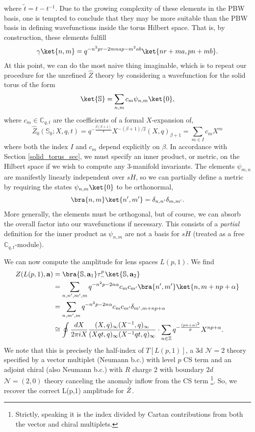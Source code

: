\documentclass{article}
\def\be{\begin{equation}}
\def\ee{\end{equation}}
\numberwithin{corollary}{theorem}
\numberwithin{corollary}{proposition}
\begin{document}
where $\tilde{t} = t-t^{-1}$. Due to the growing complexity of these elements in the PBW basis, one is tempted to conclude that they may be more suitable than the PBW basis in defining wavefunctions inside the torus Hilbert space. That is, by construction, these elements fulfill 
$$\gamma \ket{n,m} = q^{-n^2pr -2m n ap -m^2 ab}\ket{nr+ma,pn+mb}.$$
At this point, we can do the most naive thing imaginable, which is to repeat our procedure for the unrefined $\hat{Z}$ theory by considering a wavefunction for the solid torus of the form
\be \label{wrong_ref_torus_wavfn}\ket{\mathbb{S}} = \sum_{n,m} c_m \psi_{n,m}\ket{0},\ee 
where $c_m \in \mathbb{C}_{q,t}$ are the coefficients of a formal $X$-expansion of,
$$\hat{Z}_0 (\mathbb{S}_0;X,q,t) = q^{-\frac{\beta(\beta+1)}{4}}X^{-(\beta+1)/2} (X,q)_{\beta+1} = \sum_{m\in I} c_m X^m $$
where both the index $I$ and $c_m$ depend explicitly on $\beta$. In accordance with Section \ref{solid_torus_sec}, we must specify an inner product, or metric, on the Hilbert space if we wish to compute any 3-manifold invariants. The elements $\psi_{m,n}$ are manifestly linearly independent over $s\ddot{H}$, so we can partially define a metric by requiring the states $\psi_{n,m}\ket{0}$ to be orthonormal, 
$$\bra{n,m}\ket{n',m'} = \delta_{n,n'}\delta_{m,m'}.$$
More generally, the elements must be orthogonal, but of course, we can absorb the overall factor into our wavefunctions if necessary. This consists of a \textit{partial} definition for the inner product as $\psi_{n,m}$ are not a basis for $s\ddot{H}$ (treated as a free $\mathbb{C}_{q,t}$-module).

We can now compute the amplitude for lens spaces $L(p,1)$. We find 
\begin{align*}
Z(L(p,1),\mathbf{a})& =\bra{\mathbb{S},\mathbf{a}_1}\tau_-^p  \ket{\mathbb{S},\mathbf{a}_2}  \\
&= \sum_{n,n',m',m} q^{-n^2p -2n\alpha}  c_m c_{m'} \bra{n',m'}\ket{n,m+np+\alpha}\\
&= \sum_{n,m',m} q^{-n^2p -2n\alpha}  c_m c_{m'} \delta_{m',m+np+\alpha} \\
& \label{refined_lp1}\cong \oint\frac{dX}{2\pi i X} \frac{(X,q)_\infty (X^{-1},q)_\infty}{(Xqt,q)_\infty (X^{-1}qt,q)_\infty} \cdot \sum_{n\in\mathbb{Z}}q^{-\frac{(pn+\alpha)^2}{p}} X^{np+\alpha}.
\end{align*}
We note that this is precisely the half-index of $T[L(p,1)]$, a 3d $\mathcal{N}=2$ theory specified by a vector multiplet (Neumann b.c.) with level $p$ CS term and an adjoint chiral (also Neumann b.c.) with $R$ charge 2 with boundary $2d$ $\mathcal{N}=(2,0)$ theory canceling the anomaly inflow from the CS term \cite{GPPV}\footnote{Strictly, speaking it is the index divided by Cartan contributions from both the vector and chiral multiplets.}. So, we recover the correct L(p,1) amplitude for $\Hat{Z}$. 
\end{document}
